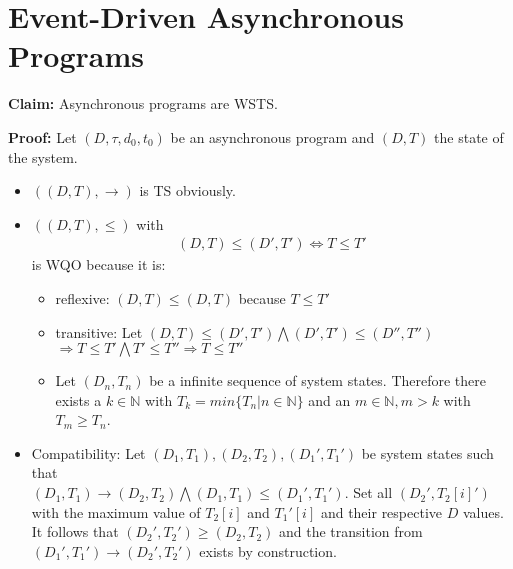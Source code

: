 \section{Event-Driven Asynchronous Programs}
\textbf{Claim: }Asynchronous programs are WSTS.

\textbf{Proof: }Let $(D,\tau,d_0,t_0)$ be an asynchronous program and $(D,T)$ the state of the system.

\begin{itemize}  
\item $((D,T),\to)$ is TS obviously.
\item $((D,T),\leq)$ with
\begin{align*}
(D,T)\leq (D',T') \Leftrightarrow T\leq T'
\end{align*}
is WQO because it is:
\begin{itemize}
\item reflexive: $(D,T)\leq (D,T)$ because $T\leq T'$
\item transitive: Let $(D,T)\leq (D',T')\bigwedge (D',T')\leq (D'',T'')$\\
$\Rightarrow T\leq T' \bigwedge T'\leq T'' \Rightarrow T\leq T''$
\item Let $(D_n,T_n)$ be a infinite sequence of  system states. Therefore there exists a $k\in\mathbb{N}$ with $T_k=min\{T_n\vert n\in\mathbb{N}\}$ and an $m\in\mathbb{N},m>k$ with $T_m\geq T_n$.
\end{itemize}
\item Compatibility: Let $(D_1,T_1),(D_2,T_2),(D_1',T_1')$ be system states such that \\ $(D_1,T_1)\to (D_2,T_2)\bigwedge (D_1,T_1)\leq (D_1',T_1')$. Set all $(D_2',T_2[i]')$ with the maximum value of $T_2[i]$ and $T_1'[i]$ and their respective $D$ values. It follows that $(D_2',T_2')\geq (D_2,T_2)$ and the transition from $(D_1',T_1')\to (D_2',T_2')$ exists by construction.
\end{itemize}